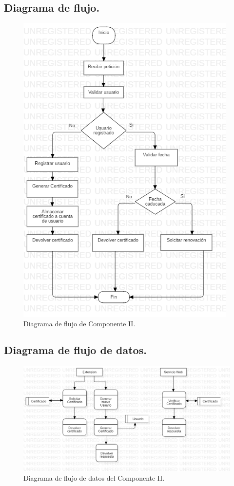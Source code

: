 \documentclass[12pt, a4paper, titlepage]{report}
\begin{document}
		\subsection{Diagrama de flujo.}
		
		\begin{figure}[H]
        	\begin{center}	\includegraphics[width=11cm]{./imagenes/Disenio/Componente_2/C2_DF_P1.png}
        	\caption{Diagrama de flujo de Componente II.}
        	\end{center}
		\end{figure}
		
		\subsection{Diagrama de flujo de datos.}
		\begin{figure}[H]
        	\begin{center}	\includegraphics[width=13cm]{./imagenes/Disenio/Componente_2/CII_DFD.png}
        	\caption{Diagrama de flujo de datos del Componente II.}
        	\end{center}
		\end{figure}
		
\end{document}

